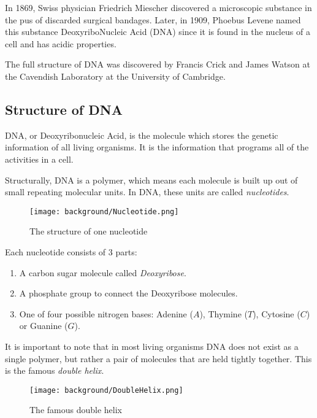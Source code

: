 In 1869, Swiss physician Friedrich Miescher discovered a microscopic substance in the pus of discarded surgical bandages. Later, in 1909, Phoebus Levene named this substance DeoxyriboNucleic Acid (DNA) since it is found in the nucleus of a cell and has acidic properties.

The full structure of DNA was discovered by Francis Crick and James Watson at the Cavendish Laboratory at the University of Cambridge.

\subsection{Structure of DNA}

DNA, or Deoxyribonucleic Acid, is the molecule which stores the genetic information of all living organisms. It is the information that programs all of the activities in a cell.

Structurally, DNA is a polymer, which means each molecule is built up out of small repeating molecular units. In DNA, these units are called \emph{nucleotides}.

\begin{figure}[H]
	\centering
	\texttt{[image: background/Nucleotide.png]}
	\caption{The structure of one nucleotide}
	\label{fig:nucleotide}
\end{figure}

Each nucleotide consists of 3 parts:

\begin{enumerate}
	\item A carbon sugar molecule called \emph{Deoxyribose}.
	\item A phosphate group to connect the Deoxyribose molecules. 
	\item One of four possible nitrogen bases: Adenine ($A$), Thymine ($T$), Cytosine ($C$) or Guanine ($G$).
\end{enumerate}

It is important to note that in most living organisms DNA does not exist as a single polymer, but rather a pair of molecules that are held tightly together. This is the famous \emph{double helix}.

\begin{figure}[H]
	\centering
	\texttt{[image: background/DoubleHelix.png]}
	\caption{The famous double helix}
	\label{fig:doubleHelix}
\end{figure}

